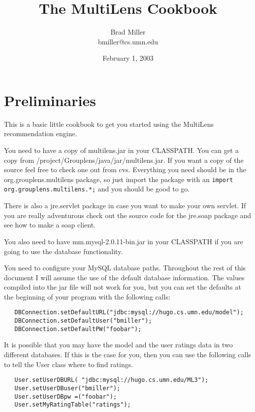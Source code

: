 \documentclass[12pt]{article}
\title{The MultiLens Cookbook}
\author{Brad Miller \\ bmiller@cs.umn.edu}
\date{February 1, 2003}
\begin{document}
\lstset{language=Java}

\maketitle
\tableofcontents

\section{Preliminaries}
This is a basic little cookbook to get you started using the MultiLens
recommendation engine.

You need to have a copy of multilens.jar in your CLASSPATH.  You can
get a copy from /project/Grouplens/java/jar/multilens.jar.  If you
want a copy of the source feel free to check one out from cvs.
Everything you need should be in the org.grouplens.multilens package,
so just import the package with an 
\lstinline$import org.grouplens.multilens.*;$ and you should be good to go.


There is also a jre.servlet package in case you want to make your own
servlet.  If you are really adventurous check out the source code for
the jre.soap package and see how to make a soap client.

You also need to have mm.mysql-2.0.11-bin.jar in your CLASSPATH if you
are going to use the database functionality.

You need to configure your MySQL database paths.  Throughout the rest of
this document I will assume the use of the default database
information.  The values compiled into the jar file will not work for
you, but you can set the defaults at the beginning of your program
with the following calls:


\begin{lstlisting}
   DBConnection.setDefaultURL("jdbc:mysql://hugo.cs.umn.edu/model");
   DBConnection.setDefaultUser("bmiller");
   DBConnection.setDefaultPW("foobar");
\end{lstlisting}

It is possible that you may have the model and the user ratings data
in two different databases.  If this is the case for you, then you can
use the following calls to tell the User class where to find ratings.

\begin{lstlisting}
   User.setUserDBURL( "jdbc:mysql://hugo.cs.umn.edu/ML3");
   User.setUserDBuser("bmiller");
   User.setUserDBpw =("foobar");
   User.setMyRatingTable("ratings");
\end{lstlisting}
\end{document}
